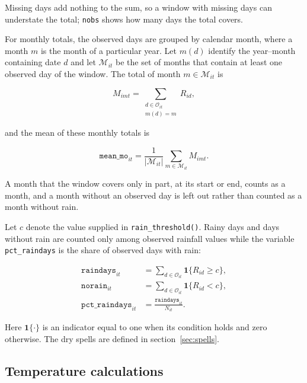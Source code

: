 \noindent Missing days add nothing to the sum, so a window with missing days can understate the total; \texttt{nobs} shows how many days the total covers.

For monthly totals, the observed days are grouped by calendar month, where a month $m$ is the month of a particular year. Let $m(d)$ identify the year--month containing date $d$ and let $\mathcal{M}_{it}$ be the set of months that contain at least one observed day of the window. The total of month $m \in \mathcal{M}_{it}$ is

\begin{equation}
	M_{imt} = \sum_{\substack{d \in \mathcal{O}_{it} \\ m(d) = m}} R_{id} ,
\end{equation}

\noindent and the mean of these monthly totals is

\begin{equation}
	\texttt{mean\_mo}_{it} = \frac{1}{\left| \mathcal{M}_{it} \right|} \sum_{m \in \mathcal{M}_{it}} M_{imt}.
\end{equation}

\noindent A month that the window covers only in part, at its start or end, counts as a month, and a month without an observed day is left out rather than counted as a month without rain.

Let $c$ denote the value supplied in \texttt{rain\_threshold()}. Rainy days and days without rain are counted only among observed rainfall values while the variable \texttt{pct\_raindays} is the share of observed days with rain:

\begin{align}
	\texttt{raindays}_{it} & = \sum_{d \in \mathcal{O}_{it}} \mathbf{1}\{R_{id} \geq c\} , \\
	\texttt{norain}_{it} & = \sum_{d \in \mathcal{O}_{it}} \mathbf{1}\{R_{id} < c\} , \\
    \texttt{pct\_raindays}_{it} &= \frac{\texttt{raindays}_{it}}{N_{it}} .
\end{align}

\noindent Here $\mathbf{1}\{\cdot\}$ is an indicator equal to one when its condition holds and zero otherwise. The dry spells are defined in section~\ref{sec:spells}.

\subsection{Temperature calculations}

